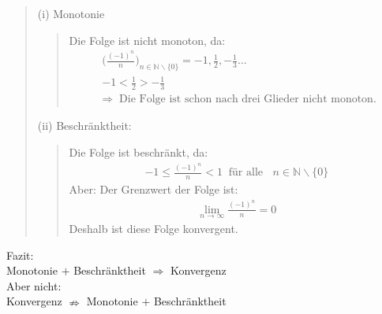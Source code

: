 \begin{quote}
	(i) Monotonie\\
	\begin{quote}
		Die Folge ist nicht monoton, da:\\
		\begin{align*}
		&\bigg(\frac{(-1)^n}{n}\bigg)_{n\in\mathbb{N}\backslash\{0\}}=-1,\frac{1}{2},-\frac{1}{3}\ldots\\
		&-1<\frac{1}{2}>-\frac{1}{3}\\&\Rightarrow \;\;\text{Die Folge ist schon nach drei Glieder nicht monoton. }
		\end{align*}
	\end{quote}
	(ii) Beschränktheit:\\
	\begin{quote}
		Die Folge ist beschränkt, da:\\
		\begin{align*}
		-1\leq \frac{(-1)^n}{n}<1\;\;\text{für alle }\;\;n\in\mathbb{N}\backslash\{0\}
		\end{align*}
		Aber: Der Grenzwert der Folge ist:\\
		\begin{align*}
		\lim\limits_ {n\to\infty} \frac{(-1)^n}{n}=0
		\end{align*}
		Deshalb ist diese Folge konvergent.\\
	\end{quote}
\end{quote}
Fazit:\\
Monotonie $ + $ Beschränktheit $ \Rightarrow $ Konvergenz\\
Aber nicht:\\
Konvergenz $ \nRightarrow $ Monotonie $ + $ Beschränktheit\\
